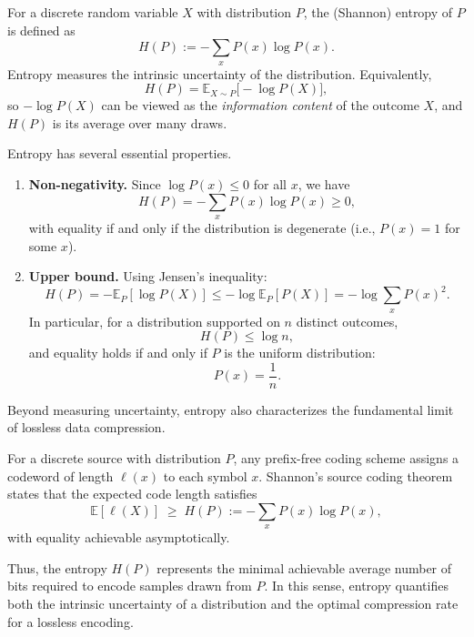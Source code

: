 \documentclass[../main]{subfiles}
\begin{document}
\begin{definition}[Entropy]
    For a discrete random variable $X$ with distribution $P$, the (Shannon)
    entropy of $P$ is defined as
    \begin{equation}
        H(P)
        := -\sum_{x} P(x)\log P(x).
    \end{equation}
    Entropy measures the intrinsic uncertainty of the distribution.  Equivalently,
    \begin{equation}
        H(P)
        = \mathbb{E}_{X\sim P}\bigl[-\log P(X)\bigr],
    \end{equation}
    so $-\log P(X)$ can be viewed as the \emph{information content} of the outcome
    $X$, and $H(P)$ is its average over many draws.
\end{definition}
Entropy has several essential properties.
\begin{enumerate}
\item
\textbf{Non-negativity.} Since $\log P(x) \le 0$ for all $x$, we have
\begin{equation}
    H(P) = -\sum_x P(x)\log P(x) \ge 0,
\end{equation}
with equality if and only if the distribution is degenerate (i.e., $P(x)=1$
for some $x$).
\item \textbf{Upper bound.}
Using Jensen's inequality:
\begin{equation}
    H(P)
    = -\mathbb{E}_{P}[\log P(X)]
    \le -\log \mathbb{E}_{P}[P(X)]
    = -\log \sum_x P(x)^2.
\end{equation}
In particular, for a distribution supported on $n$ distinct outcomes,
\begin{equation}
    H(P) \le \log n,
\end{equation}
and equality holds if and only if $P$ is the uniform distribution:
\begin{equation}
    P(x) = \frac{1}{n}.
\end{equation}
\end{enumerate}
\begin{remark}
    Beyond measuring uncertainty, entropy also characterizes the fundamental
    limit of lossless data compression.  
    
    For a discrete source with distribution $P$, any prefix-free coding scheme
    assigns a codeword of length $\ell(x)$ to each symbol $x$.  Shannon's source
    coding theorem states that the expected code length satisfies
    \begin{equation}
        \mathbb{E}[\ell(X)]
        \;\ge\;
        H(P)
        := -\sum_x P(x)\log P(x),
    \end{equation}
    with equality achievable asymptotically.
    
    Thus, the entropy $H(P)$ represents the minimal achievable average number of
    bits required to encode samples drawn from $P$.  In this sense, entropy
    quantifies both the intrinsic uncertainty of a distribution and the optimal
    compression rate for a lossless encoding.
    \end{remark}
\end{document}
